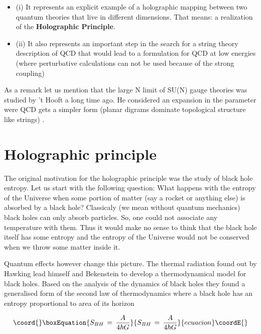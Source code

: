 \documentclass[a4paper,twocolumn,prd,groupedaddress,nofootinbib]{revtex4}
\begin{document}
\begin{itemize}
\item{(i)} It represents an explicit example of a holographic mapping between 
two quantum theories that live in different dimensions. That means: a realization of 
the  {\bf Holographic Principle}.

\item{(ii)} It also represents an important step  in the search for 
a string theory description of  QCD that would lead to a formulation for QCD 
at low energies (where perturbative calculations can not be used because of the 
strong coupling)
\end{itemize}

\bigskip 
As a remark let us mention that the large N limit of SU(N) gauge theories was studied
by 't Hooft a long time ago. He considered an expansion in the parameter \coordHE{} 
were QCD gets a simpler form (planar digrams dominate \myHighlight{$\,\rightarrow\,$}\coordHE{} topological 
structure like strings) \cite{to}.
 
\bigskip
\section{Holographic principle}
The original motivation for the holographic principle was the study 
of black hole entropy. Let us start with the following question:  What happens with 
the entropy of the Universe when some portion of matter (say a rocket or anything else)
is absorbed by a black hole?
Classicaly (we mean without quantum mechanics) black holes can only absorb particles.
So, one could not associate any temperature with them. Thus it would make no sense to 
think that the black hole itself has some entropy and the entropy of the Universe 
would not be conserved when we throw some matter inside it.

Quantum effects however change this picture. The thermal radiation found out by 
Hawking lead himself and Bekenstein\cite{Be,Ha} to develop a  thermodynamical model
for  black holes. Based on the analysis of the dynamics of black holes they found 
a generalised form of the second law of thermodynamics where a black hole has 
an entropy proportional to area of its horizon

\bigskip

\begin{equation}\coord{}\boxEquation{
\label{bhe}
S_{BH}\,=\,{A \over 4\hbar G} 
}{
S_{BH}\,=\,{A \over 4\hbar G} 
}{ecuacion}\coordE{}\end{equation}
\end{document}

